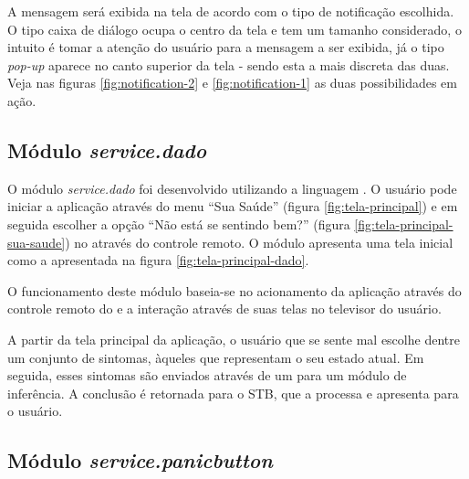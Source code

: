A mensagem será exibida na tela de acordo com o tipo de notificação escolhida. O
tipo caixa de diálogo ocupa o centro da tela e tem um tamanho considerado, o 
intuito é tomar a atenção do usuário para a mensagem a ser exibida, já o tipo
\textit{pop-up} aparece no canto superior da tela - sendo esta a mais discreta 
das duas. Veja nas figuras \ref{fig:notification-2} e \ref{fig:notification-1} 
as duas possibilidades em ação.


\subsection{Módulo \textit{service.dado}}\label{subsec:dado}

O módulo \textit{service.dado} foi desenvolvido utilizando a linguagem 
\python[]. O usuário pode iniciar a aplicação através do menu ``Sua Saúde''
(figura \ref{fig:tela-principal}) e em seguida escolher a opção ``Não está se 
sentindo bem?'' (figura \ref{fig:tela-principal-sua-saude}) no \stb[] através do 
controle remoto. O módulo apresenta uma tela inicial como a apresentada na 
figura \ref{fig:tela-principal-dado}.

O funcionamento deste módulo baseia-se no acionamento da aplicação através
do controle remoto do \stb[] e a interação através de suas telas no televisor
do usuário. 


A partir da tela principal da aplicação, o usuário que se sente mal escolhe 
dentre um conjunto de sintomas, àqueles que representam o seu estado atual. Em
seguida, esses sintomas são enviados através de um \webservice[] para um
módulo de inferência. A conclusão é retornada para o STB, que a processa e 
apresenta para o usuário.

\subsection{Módulo \textit{service.panicbutton}}\label{subsec:panicbutton}